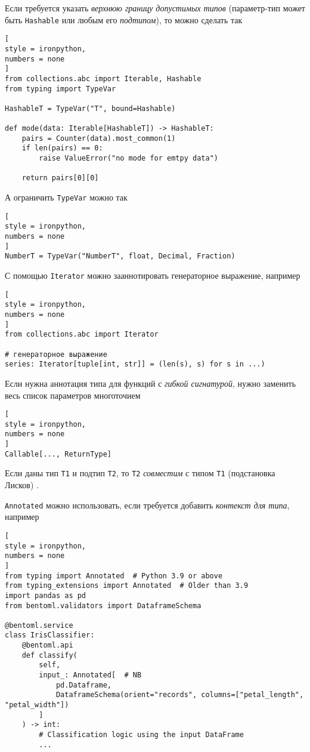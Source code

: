 \documentclass[%
	11pt,
	a4paper,
	utf8,
		]{article}
\begin{document}
Если требуется указать \emph{верхнюю границу допустимых типов} (параметр-тип может быть \verb*|Hashable| или любым его \emph{подтипом}), то можно сделать так
\begin{lstlisting}[
style = ironpython,
numbers = none
]
from collections.abc import Iterable, Hashable
from typing import TypeVar

HashableT = TypeVar("T", bound=Hashable)

def mode(data: Iterable[HashableT]) -> HashableT:
    pairs = Counter(data).most_common(1)
    if len(pairs) == 0:
        raise ValueError("no mode for emtpy data")
    
    return pairs[0][0]
\end{lstlisting}

А ограничить \verb*|TypeVar| можно так
\begin{lstlisting}[
style = ironpython,
numbers = none
]
NumberT = TypeVar("NumberT", float, Decimal, Fraction)
\end{lstlisting}

С помощью \verb*|Iterator| можно зааннотировать генераторное выражение, например
\begin{lstlisting}[
style = ironpython,
numbers = none
]
from collections.abc import Iterator

# генераторное выражение
series: Iterator[tuple[int, str]] = (len(s), s) for s in ...)
\end{lstlisting}

Если нужна аннотация типа для функций с \emph{гибкой сигнатурой}, нужно заменить весь список параметров многоточием \cite[]{ramalho:python-2022}
\begin{lstlisting}[
style = ironpython,
numbers = none
]
Callable[..., ReturnType]
\end{lstlisting}

Если даны тип \verb*|T1| и подтип \verb*|T2|, то \verb*|T2| \emph{совместим} с типом \verb*|T1| (подстановка Лисков) \cite[]{ramalho:python-2022}.

\verb*|Annotated| можно использовать, если требуется добавить \emph{контекст для типа}, например
\begin{lstlisting}[
style = ironpython,
numbers = none
]
from typing import Annotated  # Python 3.9 or above
from typing_extensions import Annotated  # Older than 3.9
import pandas as pd
from bentoml.validators import DataframeSchema

@bentoml.service
class IrisClassifier:
	@bentoml.api
	def classify(
		self,
		input_: Annotated[  # NB
		    pd.Dataframe,
		    DataframeSchema(orient="records", columns=["petal_length", "petal_width"])
		]
	) -> int:
		# Classification logic using the input DataFrame
		...
\end{lstlisting}
\end{document}
